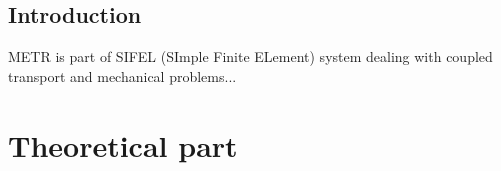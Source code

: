 \documentclass[12pt]{book}
\begin{document}
\tableofcontents
\chapter{Introduction}
METR is part of SIFEL (SImple Finite ELement) system dealing with
coupled transport and mechanical problems...


\part{Theoretical part}
%

%
%
%
\end{document}
